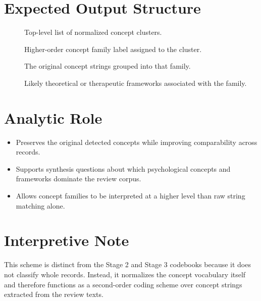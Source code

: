 \documentclass[11pt]{article}
\begin{document}
\section*{Expected Output Structure}
\begin{description}
\item[] Top-level list of normalized concept clusters.
\item[] Higher-order concept family label assigned to the cluster.
\item[] The original concept strings grouped into that family.
\item[] Likely theoretical or therapeutic frameworks associated with the family.
\end{description}

\section*{Analytic Role}
\begin{itemize}
\item Preserves the original detected concepts while improving comparability across records.
\item Supports synthesis questions about which psychological concepts and frameworks dominate the review corpus.
\item Allows concept families to be interpreted at a higher level than raw string matching alone.
\end{itemize}

\section*{Interpretive Note}
This scheme is distinct from the Stage 2 and Stage 3 codebooks because it does not classify whole records. Instead, it normalizes the concept vocabulary itself and therefore functions as a second-order coding scheme over concept strings extracted from the review texts.
\end{document}
